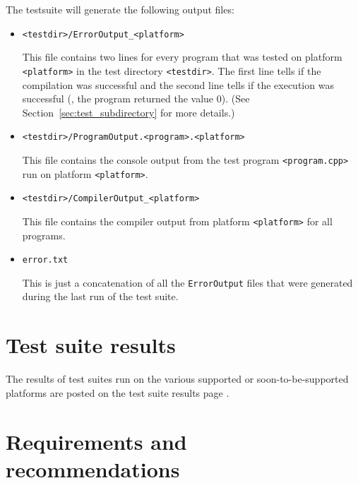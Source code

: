 The testsuite will generate the following output files:

\begin{itemize}
\item \verb|<testdir>/ErrorOutput_<platform>|

This file contains two lines for every program that was tested on
platform \texttt{<platform>} in the test directory \texttt{<testdir>}. 
The first line
tells if the compilation was successful and the second line tells if
the execution was successful (\ie, the program returned the value 0).
(See Section~\ref{sec:test_subdirectory} for more details.)

\item \verb|<testdir>/ProgramOutput.<program>.<platform>|

This file contains the console output from the test program
\texttt{<program.cpp>} run on platform \texttt{<platform>}.

\item \verb|<testdir>/CompilerOutput_<platform>|

This file contains the compiler output from platform 
\texttt{<platform>} for all programs.

\item \verb|error.txt|

This is just a concatenation of all the \texttt{ErrorOutput} files that were
generated during the last run of the test suite.
\end{itemize}


\section{Test suite results\label{sec:test_suite_results}}
The results of test suites run on the various supported or soon-to-be-supported
platforms are posted on the 
%
{test suite results} 
page 
.

\section{Requirements and recommendations\label{sec:testing_req_and_rec}}

